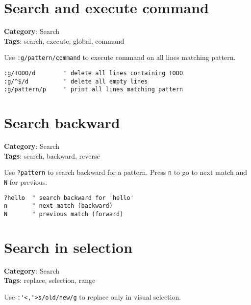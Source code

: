 {{{{{{{{{{{{{{\section{Search and execute command}

\textbf{Category}: Search\\ \textbf{Tags}: search, execute, global, command
\vspace{0.5cm}

Use {\footnotesize \Verb§:g/pattern/command§} to execute command on all lines matching pattern.

\begin{Exa*}{}
\begin{Verbatim}[fontsize=\footnotesize, breaklines, breakanywhere]
:g/TODO/d        " delete all lines containing TODO
:g/^$/d          " delete all empty lines
:g/pattern/p     " print all lines matching pattern
\end{Verbatim}
\end{Exa*}

\section{Search backward}

\textbf{Category}: Search\\ \textbf{Tags}: search, backward, reverse
\vspace{0.5cm}

Use {\footnotesize \Verb§?pattern§} to search backward for a pattern. Press {\footnotesize \Verb§n§} to go to next match and {\footnotesize \Verb§N§} for previous.

\begin{Exa*}{}
\begin{Verbatim}[fontsize=\footnotesize, breaklines, breakanywhere]
?hello  " search backward for 'hello'
n       " next match (backward)
N       " previous match (forward)
\end{Verbatim}
\end{Exa*}

\section{Search in selection}

\textbf{Category}: Search\\ \textbf{Tags}: replace, selection, range
\vspace{0.5cm}

Use {\footnotesize \Verb§:'<,'>s/old/new/g§} to replace only in visual selection.

}}}}}}}}}}}}}}
